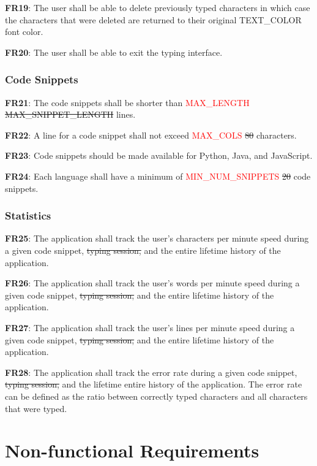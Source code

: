\documentclass[12pt, titlepage]{article}
\begin{document}
\noindent \textbf{FR19}: The user shall be able to delete previously typed characters in which case the characters that were deleted are returned to their original TEXT\_COLOR font color.

\noindent \textbf{FR20}: The user shall be able to exit the typing interface.

\subsubsection{Code Snippets}
\noindent \textbf{FR21}: The code snippets shall be shorter than \textcolor{red}{MAX\_LENGTH} \sout{MAX\_SNIPPET\_LENGTH} lines.

\noindent \textbf{FR22}: A line for a code snippet shall not exceed \textcolor{red}{MAX\_COLS} \sout{80} characters.

\noindent \textbf{FR23}: Code snippets should be made available for Python, Java, and JavaScript.

\noindent \textbf{FR24}: Each language shall have a minimum of \textcolor{red}{MIN\_NUM\_SNIPPETS} \sout{20} code snippets.

\subsubsection{Statistics}

\noindent \textbf{FR25}: The application shall track the user's characters per minute speed during a given code snippet, \sout{typing session,} and the entire lifetime history of the application.

\noindent \textbf{FR26}: The application shall track the user's words per minute speed during a given code snippet, \sout{typing session,} and the entire lifetime history of the application.

\noindent \textbf{FR27}: The application shall track the user's lines per minute speed during a given code snippet, \sout{typing session,} and the entire lifetime history of the application.

\noindent \textbf{FR28}: The application shall track the error rate during a given code snippet, \sout{typing session,} and the lifetime entire history of the application. The error rate can be defined as the ratio between correctly typed characters and all characters that were typed.



\section{Non-functional Requirements}
\end{document}
